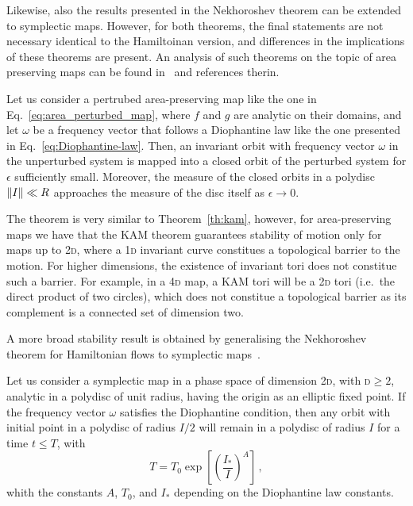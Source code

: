 Likewise, also the results presented in the Nekhoroshev theorem can be extended to symplectic maps. However, for both theorems, the final statements are not necessary identical to the Hamiltoinan version, and differences in the implications of these theorems are present. An analysis of such theorems on the topic of area preserving maps can be found in~\cite{Bazzani:262179} and references therin.

\begin{theorem}
    Let us consider a pertrubed area-preserving map like the one in Eq.~\eqref{eq:area_perturbed_map}, where $f$ and $g$ are analytic on their domains, and let $\omega$ be a frequency vector that follows a Diophantine law like the one presented in Eq.~\eqref{eq:Diophantine-law}. Then, an invariant orbit with frequency vector $\omega$ in the unperturbed system is mapped into a closed orbit of the perturbed system for $\epsilon$ sufficiently small. Moreover, the measure of the closed orbits in a polydisc $\norm{I} \ll R$ approaches the measure of the disc itself as $\epsilon \to 0$. 
\end{theorem}

The theorem is very similar to Theorem~\ref{th:kam}, however, for area-preserving maps we have that the KAM theorem guarantees stability of motion only for maps up to 2\textsc{d}, where a 1\textsc{d} invariant curve constitues a topological barrier to the motion. For higher dimensions, the existence of invariant tori does not constitue such a barrier. For example, in a 4\textsc{d} map, a KAM tori will be a 2\textsc{d} tori (i.e.\ the direct product of two circles), which does not constitue a topological barrier as its complement is a connected set of dimension two.

A more broad stability result is obtained by generalising the Nekhoroshev theorem for Hamiltonian flows to symplectic maps~\cite{Bazzani:1990aa, Turchetti:1990aa}.

\begin{theorem}
    Let us consider a symplectic map in a phase space of dimension 2\textsc{d}, with \textsc{d}$\geq 2$, analytic in a polydisc of unit radius, having the origin as an elliptic fixed point. If the frequency vector $\omega$ satisfies the Diophantine condition, then any orbit with initial point in a polydisc of radius $I/2$ will remain in a polydisc of radius $I$ for a time $t\leq T$, with
    \begin{equation}
        T = T_0 \exp\left[\left(\frac{I_\ast}{I}\right)^A\right]\,,
    \end{equation}
    whith the constants $A$, $T_0$, and $I_\ast$ depending on the Diophantine law constants.
\end{theorem}